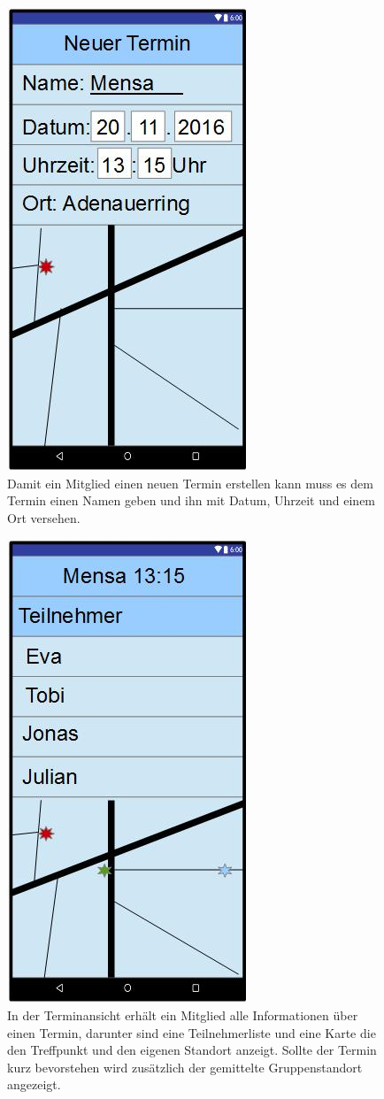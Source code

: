\documentclass{scrartcl}
\begin{document}
	\newpage
	\begin{figure}[h]
		\centering
		\includegraphics[width=.5\textwidth]{GUI_NeuerTermin.jpg}
		\caption{Damit ein Mitglied einen neuen Termin erstellen kann muss es dem Termin einen Namen geben und ihn mit Datum, Uhrzeit und einem Ort versehen.}
	\end{figure}
	
	\newpage
	\begin{figure}[h]
		\centering
		\includegraphics[width=.5\textwidth]{GUI_Termin.jpg}
		\caption{In der Terminansicht erhält ein Mitglied alle Informationen über einen Termin, darunter sind eine Teilnehmerliste und eine Karte die den Treffpunkt und den eigenen Standort anzeigt. Sollte der Termin kurz bevorstehen wird zusätzlich der gemittelte Gruppenstandort angezeigt.}
	\end{figure}
	


\appendix


\printindex
\glsaddall
\printglossaries
	
\end{document}
